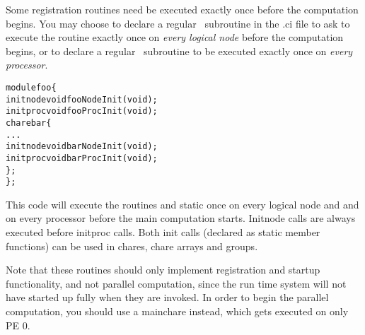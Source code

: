 
\label{initcall}
Some registration routines need be executed exactly once
before the computation begins. You may choose to 
declare a regular  \CC\ subroutine  in the .ci file
to ask \charmpp{} to execute the routine exactly once on {\em every logical node} 
before the computation begins, or to declare a regular  \CC\ subroutine 
 to be executed exactly once on {\em every processor}.

\begin{alltt}
module foo \{
    initnode void fooNodeInit(void);
    initproc void fooProcInit(void);
    chare bar \{
        ...
        initnode void barNodeInit(void);
        initproc void barProcInit(void);
    \};
\};
\end{alltt}

This code will execute the routines  and static 
 once on every logical node and 
and  on every processor before the main computation 
starts.
Initnode calls are always executed before initproc calls.
Both init calls (declared as static member functions) can be used in chares, 
chare arrays and groups.

Note that these routines should only implement registration and startup functionality, 
and not parallel computation, since
the \charmpp{} run time system will not have started up fully when they are invoked. 
In order to begin the parallel computation, you should 
use a mainchare instead, which gets executed on only PE 0.

